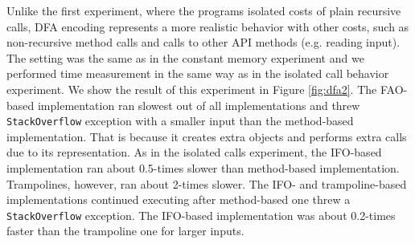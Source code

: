 Unlike the first experiment, where
the programs isolated costs of plain recursive calls, DFA encoding 
represents a more realistic behavior with other costs, such as
non-recursive method calls and calls to other API methods (e.g. reading input).
The setting was the same as in the constant memory experiment 
and we performed time measurement in the same way as in the isolated call behavior experiment. We show the result of this experiment in Figure \ref{fig:dfa2}. The
FAO-based implementation ran slowest out of all implementations and threw
\lstinline{StackOverflow} exception with a smaller input than the
method-based implementation. That is because it creates extra objects
and performs extra calls due to its representation. As in the isolated
calls experiment, the IFO-based implementation ran about 0.5-times slower than method-based
implementation. Trampolines, however, ran about 2-times slower. The IFO-
and trampoline-based implementations continued executing after method-based
one threw a \lstinline{StackOverflow} exception. The IFO-based
implementation was about 0.2-times faster than the trampoline one for 
larger inputs.